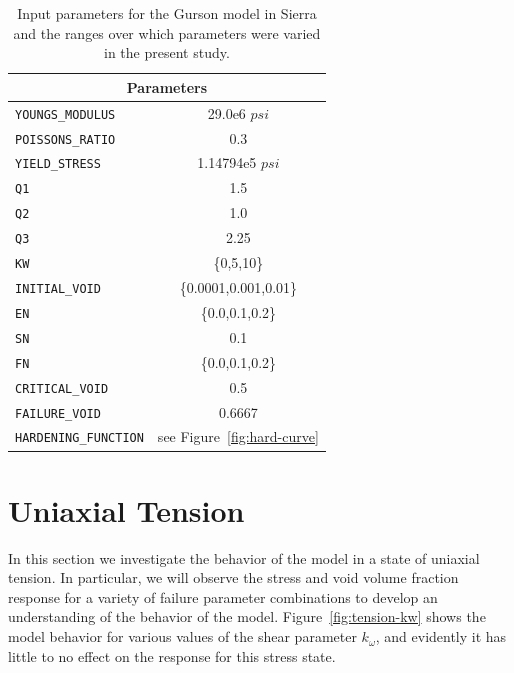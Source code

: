 \begin{table}
  \begin{center}
    \begin{tabular}{ l c }
      \toprule
      \multicolumn{2}{c}{Parameters}
      \\
      \midrule
      \verb!YOUNGS_MODULUS! & 29.0e6 $psi$
      \\ \addlinespace
      \verb!POISSONS_RATIO! & 0.3
      \\ \addlinespace
      \verb!YIELD_STRESS! & 1.14794e5 $psi$
      \\ \addlinespace
      \verb!Q1! & 1.5
      \\ \addlinespace
      \verb!Q2! & 1.0
      \\ \addlinespace
      \verb!Q3! & 2.25
      \\ \addlinespace
      \verb!KW! & \{0,5,10\}
      \\ \addlinespace
      \verb!INITIAL_VOID! & \{0.0001,0.001,0.01\} 
      \\ \addlinespace
      \verb!EN! & \{0.0,0.1,0.2\}
      \\ \addlinespace
      \verb!SN! & 0.1
      \\ \addlinespace
      \verb!FN! & \{0.0,0.1,0.2\}
      \\ \addlinespace
      \verb!CRITICAL_VOID! & 0.5
      \\ \addlinespace
      \verb!FAILURE_VOID! & 0.6667
      \\ \addlinespace
      \verb!HARDENING_FUNCTION! & see Figure~\ref{fig:hard-curve}
      \\
      \bottomrule
    \end{tabular}
    \caption{Input parameters for the Gurson model in Sierra and the
      ranges over which parameters were varied in the present study.}
    \label{sierra-parameters}
  \end{center}
\end{table}


\section{Uniaxial Tension}
\label{tension}

In this section we investigate the behavior of the model in a state of
uniaxial tension. In particular, we will observe the stress and void
volume fraction response for a variety of failure parameter
combinations to develop an understanding of the behavior of the
model. Figure~\ref{fig:tension-kw} shows the model behavior for various
values of the shear parameter $k_{\omega}$, and evidently it has
little to no effect on the response for this stress state.

